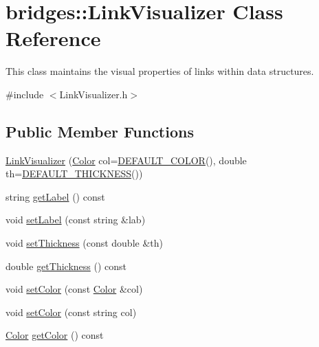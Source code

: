 \hypertarget{classbridges_1_1_link_visualizer}{}\section{bridges\+::Link\+Visualizer Class Reference}
\label{classbridges_1_1_link_visualizer}


This class maintains the visual properties of links within data structures.  




{\ttfamily \#include $<$Link\+Visualizer.\+h$>$}

\subsection*{Public Member Functions}
\begin{DoxyCompactItemize}
\item 
\mbox{\hyperlink{classbridges_1_1_link_visualizer_a69a84adf2b85773120d3f6afd938488e}{Link\+Visualizer}} (\mbox{\hyperlink{classbridges_1_1_color}{Color}} col=\mbox{\hyperlink{classbridges_1_1_link_visualizer_a5e121c52fc270337c58413d0fd72cf58}{D\+E\+F\+A\+U\+L\+T\+\_\+\+C\+O\+L\+OR}}(), double th=\mbox{\hyperlink{classbridges_1_1_link_visualizer_a6d05e052d64964d876f557901635079d}{D\+E\+F\+A\+U\+L\+T\+\_\+\+T\+H\+I\+C\+K\+N\+E\+SS}}())
\item 
string \mbox{\hyperlink{classbridges_1_1_link_visualizer_a4711364bd9108a03c6867ee2282d9fea}{get\+Label}} () const
\item 
void \mbox{\hyperlink{classbridges_1_1_link_visualizer_a7e590ad57c51ef16a1d46e05ffdf1fb3}{set\+Label}} (const string \&lab)
\item 
void \mbox{\hyperlink{classbridges_1_1_link_visualizer_a92a88e0e4c2f0c8c68f33578743c6502}{set\+Thickness}} (const double \&th)
\item 
double \mbox{\hyperlink{classbridges_1_1_link_visualizer_ae08a5f5fc9e83ea3b3d4ebebc245d3b4}{get\+Thickness}} () const
\item 
void \mbox{\hyperlink{classbridges_1_1_link_visualizer_adedc1f2b7d5d562b115ef9d8ae19fa73}{set\+Color}} (const \mbox{\hyperlink{classbridges_1_1_color}{Color}} \&col)
\item 
void \mbox{\hyperlink{classbridges_1_1_link_visualizer_ae9901d2bb4fab91af73723bfbbbcc9b4}{set\+Color}} (const string col)
\item 
\mbox{\hyperlink{classbridges_1_1_color}{Color}} \mbox{\hyperlink{classbridges_1_1_link_visualizer_a794ab99f7dc3ec9b27961e7f6072181a}{get\+Color}} () const
\end{DoxyCompactItemize}
